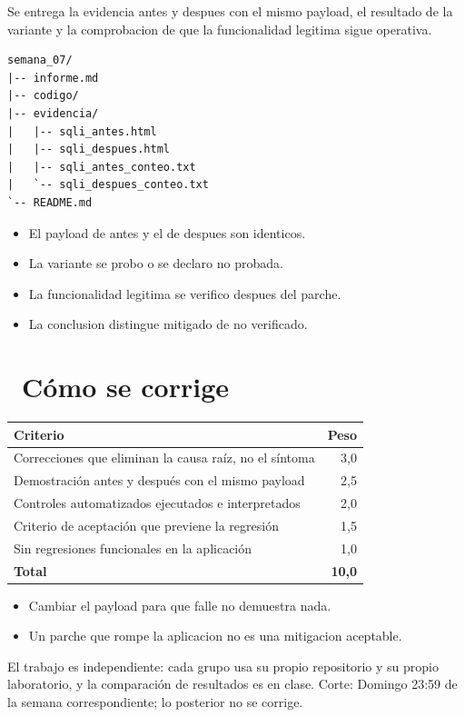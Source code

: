 \documentclass[11pt,a4paper]{article}
\newcommand{\iconotexto}[2]{\textcolor{cyanNeon}{\faIcon{#1}}~#2}
\begin{document}
Se entrega la evidencia antes y despues con el mismo payload, el resultado de la variante y la comprobacion de que la funcionalidad legitima sigue operativa.

\begin{lstlisting}[style=estiloCodigo]
semana_07/
|-- informe.md
|-- codigo/
|-- evidencia/
|   |-- sqli_antes.html
|   |-- sqli_despues.html
|   |-- sqli_antes_conteo.txt
|   `-- sqli_despues_conteo.txt
`-- README.md
\end{lstlisting}

\begin{itemize}[leftmargin=1.4em,itemsep=2pt,topsep=3pt]
  \item El payload de antes y el de despues son identicos.
  \item La variante se probo o se declaro no probada.
  \item La funcionalidad legitima se verifico despues del parche.
  \item La conclusion distingue mitigado de no verificado.
\end{itemize}

\section{\iconotexto{ruler-combined}{Cómo se corrige}}

\begin{tabularx}{\linewidth}{@{}X r@{}}
\toprule
Criterio & Peso\\
\midrule
Correcciones que eliminan la causa raíz, no el síntoma & 3,0 \\
Demostración antes y después con el mismo payload & 2,5 \\
Controles automatizados ejecutados e interpretados & 2,0 \\
Criterio de aceptación que previene la regresión & 1,5 \\
Sin regresiones funcionales en la aplicación & 1,0 \\
\midrule
\textbf{Total} & \textbf{10,0}\\
\bottomrule
\end{tabularx}

\begin{itemize}[leftmargin=1.4em,itemsep=2pt,topsep=3pt]
  \item Cambiar el payload para que falle no demuestra nada.
  \item Un parche que rompe la aplicacion no es una mitigacion aceptable.
\end{itemize}

\begin{cajaRecuerda}El trabajo es independiente: cada grupo usa su propio repositorio y su propio laboratorio, y la comparación de resultados es en clase. Corte: Domingo 23:59 de la semana correspondiente; lo posterior no se corrige.
\end{cajaRecuerda}
\end{document}
